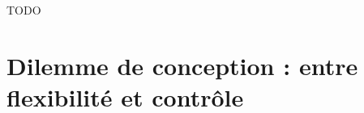 			
			\begin{leftBarExamples}
			\end{leftBarExamples}
		
		
			\begin{leftBarExamples}
				TODO
			\end{leftBarExamples}
	
	
	\section{Dilemme de conception : entre flexibilité et contrôle}
	\label{annex:B.3-ANNEXE-CHATBOTS-DILEMME}
		
